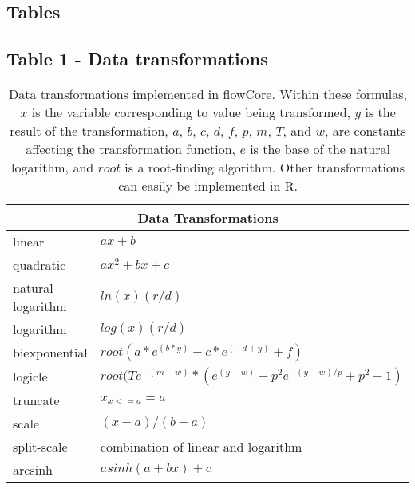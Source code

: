 \documentclass[10pt]{bmc_article}
\newcommand{\Rpackage}[1]{{\textsf{#1}}}
\newenvironment{bmcformat}{\begin{raggedright}\baselineskip20pt\sloppy\setboolean{publ}{false}}{\end{raggedright}\baselineskip20pt\sloppy}
\begin{document}
\begin{bmcformat}

\section*{Tables}
  \subsection*{Table 1 - Data transformations}
    \begin{table}[ht]
      \caption{\label{table1} Data transformations implemented in \Rpackage{flowCore}. Within these formulas, $x$ is the variable
        corresponding to value being transformed, $y$ is the result of the
        transformation, $a$, $b$, $c$, $d$, $f$, $p$, $m$, $T$, and $w$, are
        constants affecting the transformation function, $e$ is the base of
        the natural logarithm, and $root$ is a root-finding algorithm. Other transformations can easily be implemented in R.}
      \begin{center}
        \begin{tabular}{|l|l|}
          \hline
          \multicolumn{2}{|c|}{Data Transformations} \\
          \hline
          linear & $ax + b$ \\
          quadratic & $ax^2 + bx + c$ \\
          natural logarithm & $ln(x)(r/d)$ \\
          logarithm & $log(x)(r/d)$ \\
          biexponential & $root(a*e^{(b*y)}-c*e^{(-d+y)}+f)$ \\
          logicle& $root(Te^{-(m-w)}*(e^{(y-w)}-p^2e^{-(y-w)/p}+p^2-1)$ \\
          truncate & $x_{x<=a} = a$ \\
          scale & $(x-a)/(b-a)$ \\
          split-scale & combination of linear and logarithm \\
          arcsinh & $asinh(a + bx)+c$ \\
          \hline
        \end{tabular}
      \end{center}
    \end{table}


\end{bmcformat}
\end{document}
